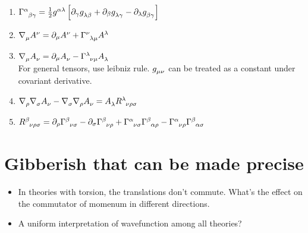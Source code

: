 \documentclass{report}
\begin{document}
\begin{itemize}
\begin{enumerate}
      \item $\Gamma\indices{^\alpha_ \beta_ \gamma} = \frac{1}{2}g\indices{^\alpha^\lambda}\left[\partial_ \gamma g\indices{_ \lambda_ \beta} + \partial_ \beta g\indices{_\lambda_ \gamma}-\partial_\lambda g\indices{_ \beta_ \gamma}\right]$
      \item
        $\nabla\indices{_\mu}A\indices{^\nu} = \partial_{\mu}A\indices{^\nu} + \Gamma\indices{^\nu_\lambda_\mu}A\indices{^\lambda}$
      \item
        $\nabla\indices{_\mu}A\indices{_\nu} = \partial_{\mu}A\indices{_\nu} - \Gamma\indices{^\lambda_\nu_\mu}A\indices{_\lambda}$ \\
        For general tensors, use leibniz rule. $g\indices{_\mu_\nu}$ can be treated as a constant under covariant derivative.

      \item $\nabla\indices{_ \rho}\nabla\indices{_\sigma}A\indices{_\nu} - \nabla\indices{_\sigma}\nabla\indices{_ \rho}A\indices{_ \nu} = A\indices{_ \lambda}R\indices{^\lambda_\nu_ \rho_\sigma}$

      \item $R\indices{^\beta_\nu_ \rho_\sigma} = \partial_ {\rho}\Gamma\indices{^\beta_\nu_\sigma}-\partial_ {\sigma}\Gamma\indices{^\beta_\nu_\rho} + \Gamma\indices{^\alpha_\nu_\sigma} \Gamma\indices{^\beta_ \alpha_ \rho} - \Gamma\indices{^\alpha_\nu_ \rho} \Gamma\indices{^\beta_ \alpha_ \sigma}$

    \end{enumerate}
\end{itemize}

\chapter{Gibberish that can be made precise}

\begin{itemize}
  \item In theories with torsion, the translations don't commute. What's the effect on the commutator of momenum in different directions.

  \item A uniform interpretation of wavefunction among all theories?

\end{itemize}
\end{document}
